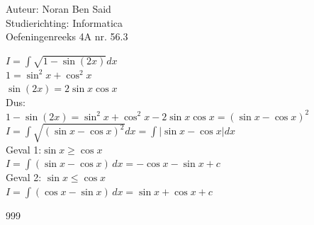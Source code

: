 \documentclass[a4paper]{article}
\begin{document}
\noindent \large Auteur: Noran Ben Said \\
\noindent \large Studierichting:  Informatica\\
\noindent \large Oefeningenreeks 4A nr. 56.3\\

\medskip

\normalsize

$I = \displaystyle\int \sqrt{1-\sin(2x)}dx$\\

$1 = \sin^2x+\cos^2x$\\

$\sin(2x)=2\sin x\cos x$\\

Dus:\\

$1-\sin(2x)=\sin^2x+\cos^2x-2\sin x\cos x = (\sin x-\cos x)^2$\\

$I=\displaystyle\int \sqrt{(\sin x-\cos x)^2}dx =\displaystyle\int |\sin x-\cos x|dx$\\


Geval 1:$\sin x \geq \cos x$\\

$I=\displaystyle\int (\sin x-\cos x)\,dx = -\cos x-\sin x+c$\\

Geval 2: $\sin x \leq \cos x$\\

$I=\displaystyle\int (\cos x-\sin x)\,dx = \sin x+\cos x+c$\\

\begin{thebibliography}{999}
\end{thebibliography}
\end{document}
